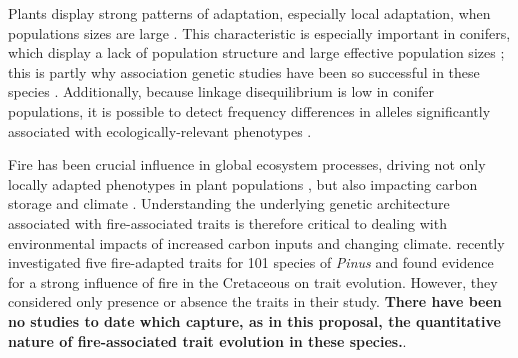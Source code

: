 Plants display strong patterns of adaptation, especially local adaptation, when populations sizes are large \citep{Leimu:2008fb}.
This characteristic is especially important in conifers, which display a lack of population structure and large effective population 
sizes \citep{Neale:2004hi}; this is partly why association genetic studies have been so successful in these species 
\citep{Eckert:2012cw,Eckert:2010hd, Wegrzyn:2010dd,Eckert:2009hh,GonzalezMartinez:2007gy,GonzalezMartinez:2006ij,Gupta:2005fx}.  
Additionally, because linkage disequilibrium is low in conifer populations, it is possible to detect frequency differences in alleles significantly 
associated with ecologically-relevant phenotypes \citep{Neale:2004hi}. 

Fire has been crucial influence in global ecosystem processes, driving not only locally adapted phenotypes in plant populations 
\citep{Lamont:1991js,Vega:2008vk,Midgley:2011dw,Keeley:2011jw,He:2012bz,Parchman:2012ca}, 
but also impacting carbon storage and climate \citep{Bowman:2009kp}.  Understanding the underlying genetic architecture 
associated with fire-associated traits is therefore critical to dealing with environmental impacts of increased carbon inputs and 
changing climate.  \citet{He:2012bz} recently investigated five fire-adapted traits for 101 species of \emph{Pinus} and found evidence 
for a strong influence of fire in the Cretaceous on trait evolution.  However, they considered only presence or absence the traits in 
their study.  \textbf{There have been no studies to date which capture, as in this proposal, the quantitative nature of fire-associated trait 
evolution in these species.}.  



